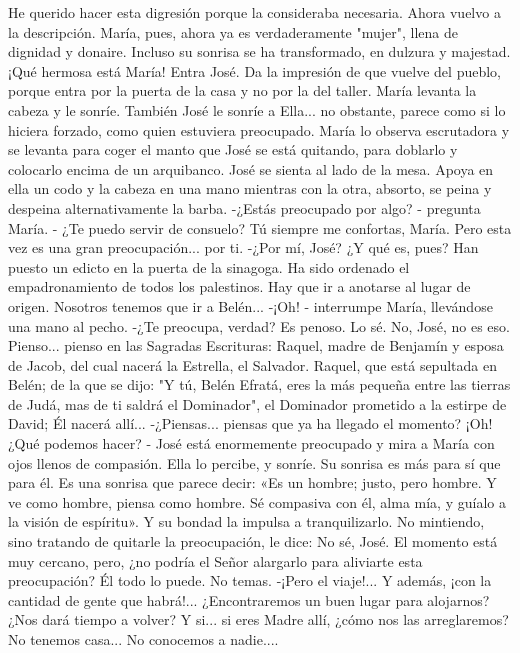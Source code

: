 \documentclass[12pt]{book} %
\begin{document}
He querido hacer esta digresión porque la consideraba necesaria. 
Ahora vuelvo a la descripción. 
María, pues, ahora ya es verdaderamente "mujer", llena de dignidad y donaire. Incluso su sonrisa se ha transformado, en dulzura y majestad. ¡Qué hermosa está María! 
Entra José. Da la impresión de que vuelve del pueblo, porque entra por la puerta de la casa y no por la del taller. María levanta la cabeza y le sonríe. También José le sonríe a Ella... no obstante, parece como si lo hiciera forzado, como quien estuviera preocupado. María lo observa escrutadora y se levanta para coger el manto que José se está quitando, para doblarlo y colocarlo encima de un arquibanco. 
José se sienta al lado de la mesa. Apoya en ella un codo y la cabeza en una mano mientras con la otra, absorto, se peina 
y despeina alternativamente la barba. 
-¿Estás preocupado por algo? - pregunta María. - ¿Te puedo servir de consuelo? 
Tú siempre me confortas, María. Pero esta vez es una gran preocupación... por ti. 
-¿Por mí, José? ¿Y qué es, pues? 
Han puesto un edicto en la puerta de la sinagoga. Ha sido ordenado el empadronamiento de todos los palestinos. Hay 
que ir a anotarse al lugar de origen. Nosotros tenemos que ir a Belén... 
-¡Oh! - interrumpe María, llevándose una mano al pecho. 
-¿Te preocupa, verdad? Es penoso. Lo sé. 
No, José, no es eso. Pienso... pienso en las Sagradas Escrituras: Raquel, madre de Benjamín y esposa de Jacob, del cual 
nacerá la Estrella, el Salvador. Raquel, que está sepultada en Belén; de la que se dijo: "Y tú, Belén Efratá, eres la más pequeña entre las tierras de Judá, mas de ti saldrá el Dominador", el Dominador prometido a la estirpe de David; Él nacerá allí... 
-¿Piensas... piensas que ya ha llegado el momento? ¡Oh! ¿Qué podemos hacer? - José está enormemente preocupado y 
mira a María con ojos llenos de compasión. 
Ella lo percibe, y sonríe. Su sonrisa es más para sí que para él. Es una sonrisa que parece decir: «Es un hombre; justo, pero hombre. Y ve como hombre, piensa como hombre. Sé compasiva con él, alma mía, y guíalo a la visión de espíritu». Y su bondad la impulsa a tranquilizarlo. No mintiendo, sino tratando de quitarle la preocupación, le dice: 
No sé, José. El momento está muy cercano, pero, ¿no podría el Señor alargarlo para aliviarte esta preocupación? Él todo lo puede. No temas. 
-¡Pero el viaje!... Y además, ¡con la cantidad de gente que habrá!... ¿Encontraremos un buen lugar para alojarnos? ¿Nos 
dará tiempo a volver? Y si... si eres Madre allí, ¿cómo nos las arreglaremos? No tenemos casa... No conocemos a nadie.... 
\end{document}
